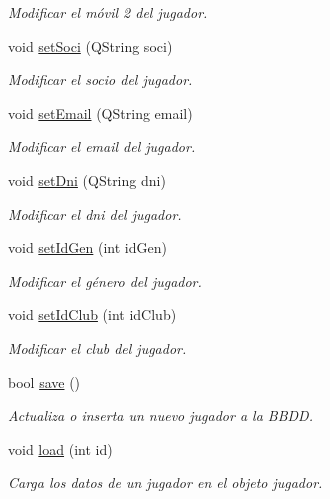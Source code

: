 \begin{DoxyCompactItemize}
\begin{DoxyCompactList}\small\item\em Modificar el móvil 2 del jugador. \end{DoxyCompactList}\item 
void \mbox{\hyperlink{classjugador_a684e5c98a3c39214b93923615d1a2fb2}{set\+Soci}} (Q\+String soci)
\begin{DoxyCompactList}\small\item\em Modificar el socio del jugador. \end{DoxyCompactList}\item 
void \mbox{\hyperlink{classjugador_a75f1d73c24c859503450958bbf1d48ea}{set\+Email}} (Q\+String email)
\begin{DoxyCompactList}\small\item\em Modificar el email del jugador. \end{DoxyCompactList}\item 
void \mbox{\hyperlink{classjugador_a442a923a8704d783a9b0b7ce917a7e39}{set\+Dni}} (Q\+String dni)
\begin{DoxyCompactList}\small\item\em Modificar el dni del jugador. \end{DoxyCompactList}\item 
void \mbox{\hyperlink{classjugador_aa0fd016230cc38f0ac2e7cd6c90003d3}{set\+Id\+Gen}} (int id\+Gen)
\begin{DoxyCompactList}\small\item\em Modificar el género del jugador. \end{DoxyCompactList}\item 
void \mbox{\hyperlink{classjugador_ac869d669d44efd142595e087cbb2b3f3}{set\+Id\+Club}} (int id\+Club)
\begin{DoxyCompactList}\small\item\em Modificar el club del jugador. \end{DoxyCompactList}\item 
bool \mbox{\hyperlink{classjugador_af56aa410ca759cb4e3548af92de007b0}{save}} ()
\begin{DoxyCompactList}\small\item\em Actualiza o inserta un nuevo jugador a la B\+B\+DD. \end{DoxyCompactList}\item 
void \mbox{\hyperlink{classjugador_a9b57bb55fbd19cf2a1fee8397eeb0135}{load}} (int id)
\begin{DoxyCompactList}\small\item\em Carga los datos de un jugador en el objeto jugador. \end{DoxyCompactList}\end{DoxyCompactItemize}
